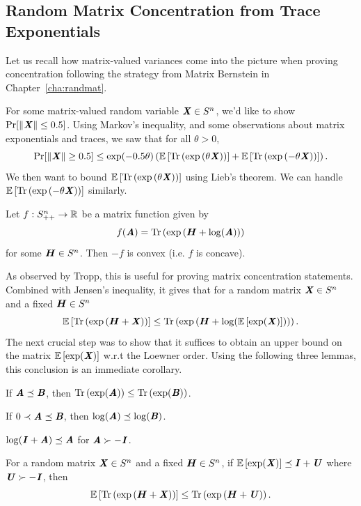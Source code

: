 \subsection{Random Matrix Concentration from Trace Exponentials}
Let us recall how matrix-valued variances come into the picture when
proving concentration following the strategy from Matrix Bernstein in
Chapter~\ref{cha:randmat}.

For some matrix-valued random variable $\boldsymbol{\mathit{X}} \in S^n$,
we'd like to show $\Pr[ \left\| \boldsymbol{\mathit{X}} \right\| \leq 0.5 ]$.
Using Markov's inequality, and some observations about matrix
exponentials and traces, we saw that for all $\theta > 0$,
\begin{equation}
  \label{eq:masterprob}
  \Pr[ \norm{\XX} \geq 0.5 ]
  \leq
  \exp(-0.5\theta ) \left(\E{\trace{ \exp\left(\theta \XX\right)}}
  +
  \E{\trace{ \exp\left(-\theta \XX\right)}}
  \right)
  .
\end{equation}
We then want to bound $\mathop{{}\mathbb{E}}\left[\mathrm{Tr} \left( \exp\left(\theta \boldsymbol{\mathit{X}}\right) \right)\right]$
using Lieb's theorem.
We can handle $\mathop{{}\mathbb{E}}\left[\mathrm{Tr} \left( \exp\left(-\theta \boldsymbol{\mathit{X}}\right) \right)\right]$ similarly.
\begin{theorem}[Lieb]
  \label{thm:Lieb}
  Let $f:S^n_{++}\to\mathbb{R}$ be a matrix function given by
  \[ f(\boldsymbol{\mathit{A}}) = \mathrm{Tr} \left(\exp\left(\boldsymbol{{H}}+\log(\boldsymbol{\mathit{A}})\right) \right) \]
  for some $\boldsymbol{{H}}\in S^n$. Then $-f$ is convex (i.e. $f$ is concave).
\end{theorem}
As observed by Tropp, this is useful for proving matrix concentration statements.
Combined with Jensen's inequality, it gives that for a random matrix
$\boldsymbol{\mathit{X}} \in S^n $ and a fixed $\boldsymbol{{H}} \in S^n$
\[
  \mathop{{}\mathbb{E}}\left[\mathrm{Tr} \left( \exp\left(\boldsymbol{{H}}+\boldsymbol{\mathit{X}}\right) \right)\right]
    \leq
    \mathrm{Tr} \left( \exp\left(\boldsymbol{{H}}+\log(\mathop{{}\mathbb{E}}\left[\exp(\boldsymbol{\mathit{X}})\right])\right) \right)
  .
\]
The next crucial step was to show that it suffices to obtain an upper
bound on the matrix $\mathop{{}\mathbb{E}}\left[\exp(\boldsymbol{\mathit{X}})\right]$ w.r.t the Loewner order.
Using the following three lemmas, this conclusion is an immediate
corollary.
\begin{lemma}\label{lem:trexpmono}
  If $\boldsymbol{\mathit{A}}\preceq\boldsymbol{\mathit{B}}$, then $\mathrm{Tr} \left(\exp(\boldsymbol{\mathit{A}}) \right)\leq\mathrm{Tr} \left(\exp(\boldsymbol{\mathit{B}}) \right)$.
\end{lemma}
\begin{lemma}\label{lem:logmono}
  If $0\prec\boldsymbol{\mathit{A}}\preceq\boldsymbol{\mathit{B}}$, then $\log(\boldsymbol{\mathit{A}})\preceq\log(\boldsymbol{\mathit{B}})$.
\end{lemma}
\begin{lemma}\label{lem:ineq_log}
  $\log(\boldsymbol{\mathit{I}}+\boldsymbol{\mathit{A}}) \preceq \boldsymbol{\mathit{A}}$ for $\boldsymbol{\mathit{A}}\succ-\boldsymbol{\mathit{I}}$.
\end{lemma}
%
\begin{corollary}
  \label{cor:trexpub}
  For a random matrix
  $\boldsymbol{\mathit{X}} \in S^n $ and a fixed $\boldsymbol{{H}} \in S^n$,
  if $\mathop{{}\mathbb{E}}\left[\exp(\boldsymbol{\mathit{X}})\right] \preceq \boldsymbol{\mathit{I}} + \boldsymbol{\mathit{U}}$ where $\boldsymbol{\mathit{U}} \succ -\boldsymbol{\mathit{I}}$, then
\[
  \mathop{{}\mathbb{E}}\left[\mathrm{Tr} \left( \exp\left(\boldsymbol{{H}}+\boldsymbol{\mathit{X}}\right) \right)\right]
    \leq
    \mathrm{Tr} \left( \exp\left(\boldsymbol{{H}}+\boldsymbol{\mathit{U}}\right) \right)
  .
\]
\end{corollary}

